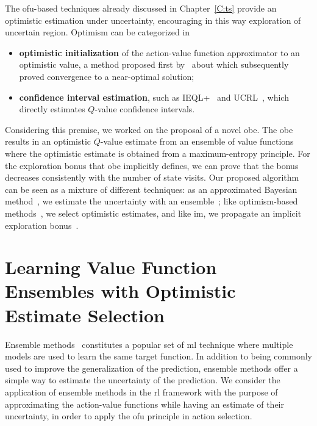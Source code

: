 The \gls{ofu}-based techniques already discussed in Chapter~\ref{C:ts} provide an optimistic estimation under uncertainty, encouraging in this way exploration of uncertain region. Optimism can be categorized in
\begin{itemize}
 \item \textbf{optimistic initialization} of the action-value function approximator to an optimistic value, a method proposed first by~\cite{sutton1998reinforcement} about which subsequently~\cite{even2002convergence} proved convergence to a near-optimal solution;
 \item \textbf{confidence interval estimation}, such as IEQL+~\cite{meuleau1999exploration} and UCRL~\cite{auer2007logarithmic}, which directly estimates $Q$-value confidence intervals.
\end{itemize}

Considering this premise, we worked on the proposal of a novel \gls{obe}. The \gls{obe} results in an optimistic $Q$-value estimate
from an ensemble of value functions where the optimistic estimate is obtained from a maximum-entropy principle. For the exploration bonus that \gls{obe} implicitly defines, we can prove that the bonus decreases consistently with the number of
state visits. Our proposed algorithm can be seen as a mixture of
different techniques: as an approximated Bayesian method~\cite{engel2005reinforcement,vlassis2012bayesian}, we estimate
the uncertainty with an ensemble~\cite{osband2017deep}; like optimism-based methods~\cite{lai1985asymptotically,kearns2002near,brafman2002r,azizzadenesheli2517efficient}, we select
optimistic estimates, and like \gls{im}, we propagate an implicit
exploration bonus~\cite{singh2004intrinsically,schmidhuber2008driven,white2010interval}.

\section{Learning Value Function Ensembles with Optimistic Estimate Selection}
\label{sec:obe}
Ensemble methods~\cite{opitz1999popular} constitutes a popular set of \gls{ml} technique where multiple models are used to learn the same target function. In addition to being commonly used to improve the generalization of the prediction, ensemble methods offer a simple way to estimate the uncertainty of the prediction. We consider the application of ensemble methods in the \gls{rl} framework with the purpose of approximating the action-value functions while having an estimate of their uncertainty, in order to apply the \gls{ofu} principle in action selection.

